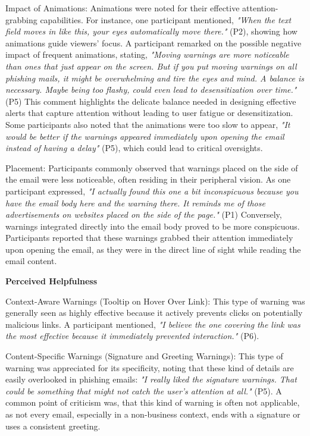 \documentclass[
  a4paper,  %
  twoside,  %
  bibliography=totoc,
  headsepline,
  cleardoublepage=empty,
  parskip=half,
  draft=false
]{scrbook}
\begin{document}
Impact of Animations: Animations were noted for their effective attention-grabbing capabilities. For instance, one participant mentioned, \textit{"When the text field moves in like this, your eyes automatically move there."} (P2), showing how animations guide viewers' focus. A participant remarked on the possible negative impact of frequent animations, stating, \textit{"Moving warnings are more noticeable than ones that just appear on the screen. But if you put moving warnings on all phishing mails, it might be overwhelming and tire the eyes and mind. A balance is necessary. Maybe being too flashy, could even lead to desensitization over time."} (P5) This comment highlights the delicate balance needed in designing effective alerts that capture attention without leading to user fatigue or desensitization. Some participants also noted that the animations were too slow to appear, \textit{"It would be better if the warnings appeared immediately upon opening the email instead of having a delay"} (P5), which could lead to critical oversights. %
    
Placement: Participants commonly observed that warnings placed on the side of the email were less noticeable, often residing in their peripheral vision. As one participant expressed, \textit{"I actually found this one a bit inconspicuous because you have the email body here and the warning there. It reminds me of those advertisements on websites placed on the side of the page."} (P1) Conversely, warnings integrated directly into the email body proved to be more conspicuous. Participants reported that these warnings grabbed their attention immediately upon opening the email, as they were in the direct line of sight while reading the email content. 


\textbf{Perceived Helpfulness}

Context-Aware Warnings (Tooltip on Hover Over Link): This type of warning was generally seen as highly effective because it actively prevents clicks on potentially malicious links. A participant mentioned, \textit{"I believe the one covering the link was the most effective because it immediately prevented interaction."} (P6).
    
Content-Specific Warnings (Signature and Greeting Warnings): This type of warning was appreciated for its specificity, noting that these kind of details are easily overlooked in phishing emails: \textit{"I really liked the signature warnings. That could be something that might not catch the user’s attention at all."} (P5). A common point of criticism was, that this kind of warning is often not applicable, as not every email, especially in a non-business context, ends with a signature or uses a consistent greeting.
      
\end{document}

